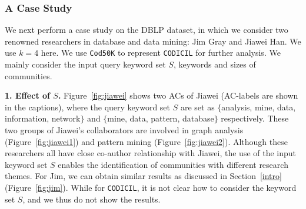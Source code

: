 \subsubsection{A Case Study}
\label{caseStudy}

We next perform a case study on the DBLP dataset, in which we consider two renowned researchers in database and data mining: Jim Gray and Jiawei Han. We use $k=4$ here. We use {\tt Cod50K} to represent {\tt CODICIL} for further analysis.
We mainly consider the input query keyword set $S$, keywords and sizes of communities.

{\bf 1. Effect of $S$.} Figure~\ref{fig:jiawei} shows two ACs of Jiawei (AC-labels are shown in the captions),
where the query keyword set $S$ are set as $\{$analysis, mine, data, information, network$\}$ and $\{$mine, data, pattern, database$\}$ respectively. These two groups of Jiawei's collaborators are involved in graph analysis (Figure~\ref{fig:jiawei1}) and pattern mining (Figure~\ref{fig:jiawei2}). Although these researchers all have close co-author relationship with Jiawei, the use of the input keyword set $S$ enables the identification of communities with different research themes.
For Jim, we can obtain similar results as discussed in Section~\ref{intro} (Figure~\ref{fig:jim}).
While for {\tt CODICIL}, it is not clear how to consider the keyword set $S$, and we thus do not show the results.

